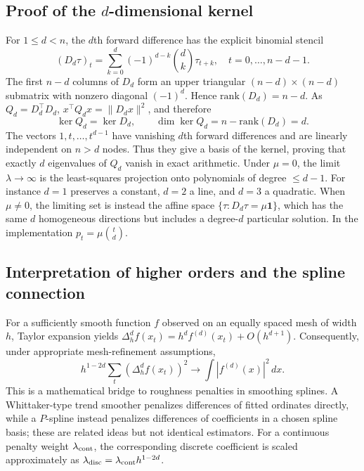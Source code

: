 \subsection{Proof of the $d$-dimensional kernel}
For $1\le d<n$, the $d$th forward difference has the explicit binomial stencil
\begin{equation}\label{eq:stencil2}
 (D_d\tau)_t=\sum_{k=0}^{d}(-1)^{d-k}\binom{d}{k}\tau_{t+k},\quad
 t=0,\ldots,n-d-1.
\end{equation}
The first $n-d$ columns of $D_d$ form an upper triangular
$(n-d)\times(n-d)$ submatrix with nonzero diagonal $(-1)^d$.
Hence $\mathrm{rank}(D_d)=n-d$. As $Q_d=D_d^\top D_d$,
$x^\top Q_dx=\|D_dx\|^2$, and therefore
\begin{equation}\label{eq:kernel-proof}
\ker Q_d=\ker D_d,\qquad
\dim\ker Q_d=n-\mathrm{rank}(D_d)=d.
\end{equation}
The vectors $1,t,\ldots,t^{d-1}$ have vanishing $d$th forward differences
and are linearly independent on $n>d$ nodes. Thus they give a basis
of the kernel, proving that exactly $d$ eigenvalues of $Q_d$ vanish
in exact arithmetic. Under $\mu=0$, the limit $\lambda\to\infty$
is the least-squares projection onto polynomials of degree $\le d-1$.
For instance $d=1$ preserves a constant, $d=2$ a line, and
$d=3$ a quadratic. When $\mu\ne0$, the limiting set is instead
the affine space $\{\tau:D_d\tau=\mu\mathbf1\}$, which has the same
$d$ homogeneous directions but includes a degree-$d$ particular
solution. In the implementation $p_t=\mu\binom{t}{d}$.

\subsection{Interpretation of higher orders and the spline connection}
For a sufficiently smooth function $f$ observed on an equally spaced
mesh of width $h$, Taylor expansion yields
$\Delta_h^df(x_t)=h^df^{(d)}(x_t)+O(h^{d+1})$. Consequently,
under appropriate mesh-refinement assumptions,
\begin{equation}\label{eq:spline-bridge}
h^{1-2d}\sum_t(\Delta_h^df(x_t))^2
\longrightarrow\int |f^{(d)}(x)|^2\,dx.
\end{equation}
This is a mathematical bridge to roughness penalties in smoothing
splines. A Whittaker-type trend smoother penalizes differences
of fitted ordinates directly, while a $P$-spline instead penalizes
differences of coefficients in a chosen spline basis; these are related
ideas but not identical estimators. For a continuous penalty weight
$\lambda_{\rm cont}$, the corresponding discrete coefficient is scaled
approximately as $\lambda_{\rm disc}=\lambda_{\rm cont}h^{1-2d}$.

